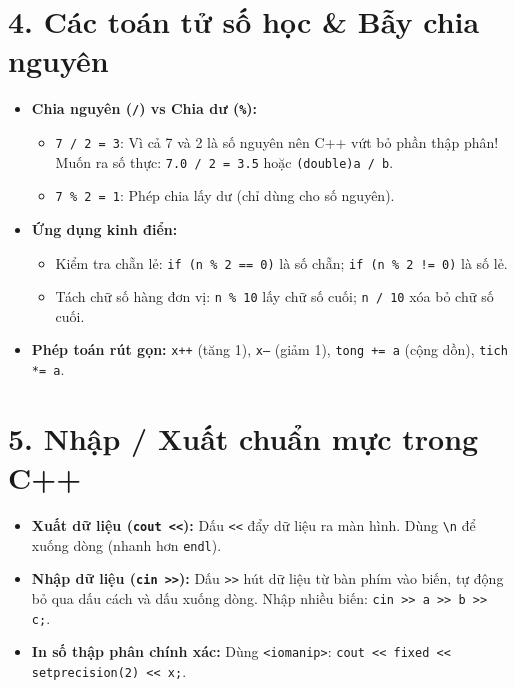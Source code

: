 \documentclass[11pt,a4paper]{article}
\begin{document}
\section*{\color{AsianDarkBlue}\normalsize 4. Các toán tử số học \& Bẫy chia nguyên}
\begin{itemize}
    \setlength{\itemsep}{2pt}
    \small
    \item \textbf{Chia nguyên (\texttt{/}) vs Chia dư (\texttt{\%}):}
    \begin{itemize}
        \item \texttt{7 / 2 = 3}: Vì cả 7 và 2 là số nguyên nên C++ vứt bỏ phần thập phân! Muốn ra số thực: \texttt{7.0 / 2 = 3.5} hoặc \texttt{(double)a / b}.
        \item \texttt{7 \% 2 = 1}: Phép chia lấy dư (chỉ dùng cho số nguyên).
    \end{itemize}
    \item \textbf{Ứng dụng kinh điển:}
    \begin{itemize}
        \item Kiểm tra chẵn lẻ: \texttt{if (n \% 2 == 0)} là số chẵn; \texttt{if (n \% 2 != 0)} là số lẻ.
        \item Tách chữ số hàng đơn vị: \texttt{n \% 10} lấy chữ số cuối; \texttt{n / 10} xóa bỏ chữ số cuối.
    \end{itemize}
    \item \textbf{Phép toán rút gọn:} \texttt{x++} (tăng 1), \texttt{x--} (giảm 1), \texttt{tong += a} (cộng dồn), \texttt{tich *= a}.
\end{itemize}

\newpage

\section*{\color{AsianDarkBlue}\normalsize 5. Nhập / Xuất chuẩn mực trong C++}
\begin{itemize}
    \setlength{\itemsep}{2pt}
    \small
    \item \textbf{Xuất dữ liệu (\texttt{cout <<}):} Dấu \texttt{<<} đẩy dữ liệu ra màn hình. Dùng \texttt{\textbackslash n} để xuống dòng (nhanh hơn \texttt{endl}).
    \item \textbf{Nhập dữ liệu (\texttt{cin >>}):} Dấu \texttt{>>} hút dữ liệu từ bàn phím vào biến, tự động bỏ qua dấu cách và dấu xuống dòng. Nhập nhiều biến: \texttt{cin >> a >> b >> c;}.
    \item \textbf{In số thập phân chính xác:} Dùng \texttt{<iomanip>}: \texttt{cout << fixed << setprecision(2) << x;}.
\end{itemize}
\end{document}
